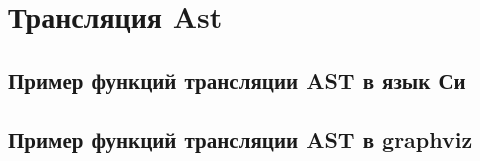 % 


\section*{Трансляция Ast}
\subsection*{Пример функций трансляции AST в язык Си}


\subsection*{Пример функций трансляции AST в graphviz}


% 







